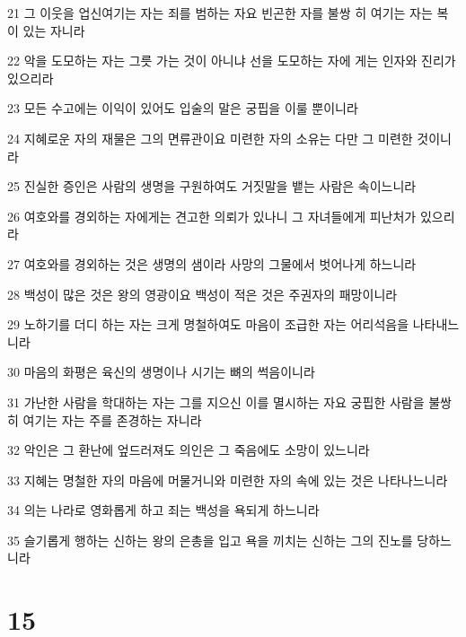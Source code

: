 \par 21 그 이웃을 업신여기는 자는 죄를 범하는 자요 빈곤한 자를 불쌍 히 여기는 자는 복이 있는 자니라
\par 22 악을 도모하는 자는 그릇 가는 것이 아니냐 선을 도모하는 자에 게는 인자와 진리가 있으리라
\par 23 모든 수고에는 이익이 있어도 입술의 말은 궁핍을 이룰 뿐이니라
\par 24 지혜로운 자의 재물은 그의 면류관이요 미련한 자의 소유는 다만 그 미련한 것이니라
\par 25 진실한 증인은 사람의 생명을 구원하여도 거짓말을 뱉는 사람은 속이느니라
\par 26 여호와를 경외하는 자에게는 견고한 의뢰가 있나니 그 자녀들에게 피난처가 있으리라
\par 27 여호와를 경외하는 것은 생명의 샘이라 사망의 그물에서 벗어나게 하느니라
\par 28 백성이 많은 것은 왕의 영광이요 백성이 적은 것은 주권자의 패망이니라
\par 29 노하기를 더디 하는 자는 크게 명철하여도 마음이 조급한 자는 어리석음을 나타내느니라
\par 30 마음의 화평은 육신의 생명이나 시기는 뼈의 썩음이니라
\par 31 가난한 사람을 학대하는 자는 그를 지으신 이를 멸시하는 자요 궁핍한 사람을 불쌍히 여기는 자는 주를 존경하는 자니라
\par 32 악인은 그 환난에 엎드러져도 의인은 그 죽음에도 소망이 있느니라
\par 33 지혜는 명철한 자의 마음에 머물거니와 미련한 자의 속에 있는 것은 나타나느니라
\par 34 의는 나라로 영화롭게 하고 죄는 백성을 욕되게 하느니라
\par 35 슬기롭게 행하는 신하는 왕의 은총을 입고 욕을 끼치는 신하는 그의 진노를 당하느니라

\chapter{15}

